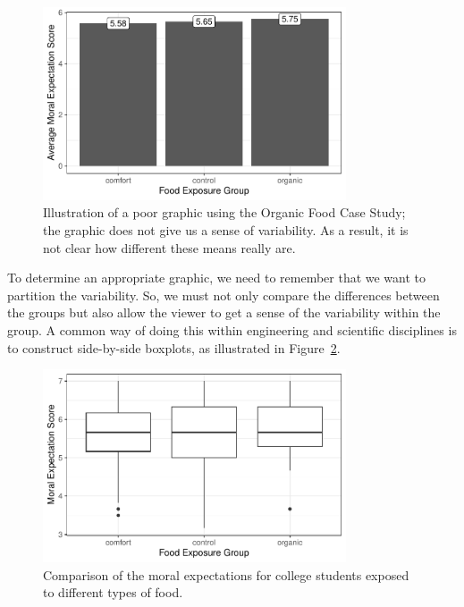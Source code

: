 \documentclass[
  letterpaper,
  DIV=11,
  numbers=noendperiod]{scrreprt}
\theoremstyle{definition}
\theoremstyle{definition}
\theoremstyle{plain}
\theoremstyle{remark}
\begin{document}
\begin{figure}

{\centering \includegraphics[width=0.8\textwidth,height=\textheight]{./images/fig-anovasummaries-bad-bar-1.pdf}

}

\caption{\label{fig-anovasummaries-bad-bar}Illustration of a poor
graphic using the Organic Food Case Study; the graphic does not give us
a sense of variability. As a result, it is not clear how different these
means really are.}

\end{figure}

To determine an appropriate graphic, we need to remember that we want to
partition the variability. So, we must not only compare the differences
between the groups but also allow the viewer to get a sense of the
variability within the group. A common way of doing this within
engineering and scientific disciplines is to construct side-by-side
boxplots, as illustrated in
Figure~\ref{fig-anovasummaries-organic-boxplot}.

\begin{figure}

{\centering \includegraphics[width=0.8\textwidth,height=\textheight]{./images/fig-anovasummaries-organic-boxplot-1.pdf}

}

\caption{\label{fig-anovasummaries-organic-boxplot}Comparison of the
moral expectations for college students exposed to different types of
food.}

\end{figure}
\end{document}
